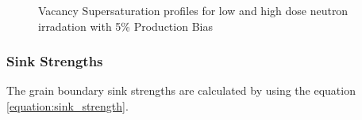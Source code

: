\documentclass[a4paper]{article}
\begin{document}
\begin{figure}[h!]
        \caption{Vacancy Supersaturation profiles for low and high dose neutron irradation with 5\% Production Bias}
        \label{figure:vacancy_supersaturation_neutron_5}
      \end{figure}

    \newpage
    \subsubsection{Sink Strengths} \hspace{10pt}
    The grain boundary sink strengths are calculated by using the equation \ref{equation:sink_strength}.
      \begin{figure}[h!]  %
        \centering
        \qquad

\end{figure}
\end{document}
